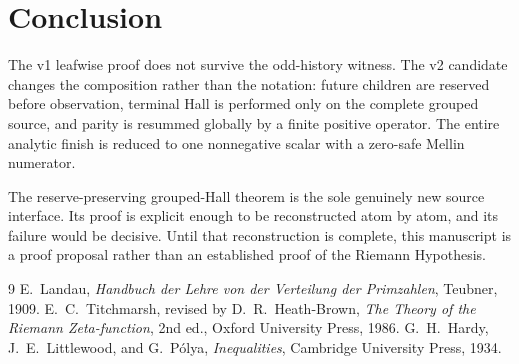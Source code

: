 \documentclass[11pt]{article}
\newcommand{\1}{\mathbf 1}
\begin{document}
\section{Conclusion}

The v1 leafwise proof does not survive the odd-history witness.  The v2 candidate changes the composition rather than the notation: future children are reserved before observation, terminal Hall is performed only on the complete grouped source, and parity is resummed globally by a finite positive operator.  The entire analytic finish is reduced to one nonnegative scalar with a zero-safe Mellin numerator.

The reserve-preserving grouped-Hall theorem is the sole genuinely new source interface.  Its proof is explicit enough to be reconstructed atom by atom, and its failure would be decisive.  Until that reconstruction is complete, this manuscript is a proof proposal rather than an established proof of the Riemann Hypothesis.

\begin{thebibliography}{9}
E.~Landau, \emph{Handbuch der Lehre von der Verteilung der Primzahlen}, Teubner, 1909.
E.~C.~Titchmarsh, revised by D.~R.~Heath-Brown, \emph{The Theory of the Riemann Zeta-function}, 2nd ed., Oxford University Press, 1986.
G.~H.~Hardy, J.~E.~Littlewood, and G.~P\'olya, \emph{Inequalities}, Cambridge University Press, 1934.
\end{thebibliography}
\end{document}
